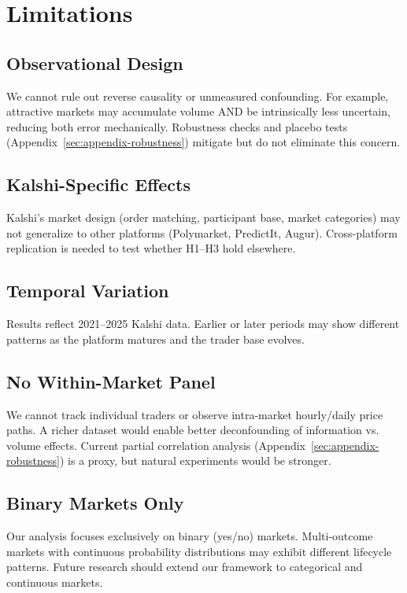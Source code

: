 \documentclass[12pt,letterpaper]{article}
\begin{document}
\clearpage
\section{Limitations}\label{sec:limitations}

\subsection{Observational Design}

We cannot rule out reverse causality or unmeasured confounding. For example, attractive markets may accumulate volume AND be intrinsically less uncertain, reducing both error mechanically. Robustness checks and placebo tests (Appendix~\ref{sec:appendix-robustness}) mitigate but do not eliminate this concern.

\subsection{Kalshi-Specific Effects}

Kalshi's market design (order matching, participant base, market categories) may not generalize to other platforms (Polymarket, PredictIt, Augur). Cross-platform replication is needed to test whether H1--H3 hold elsewhere.

\subsection{Temporal Variation}

Results reflect 2021--2025 Kalshi data. Earlier or later periods may show different patterns as the platform matures and the trader base evolves.

\subsection{No Within-Market Panel}

We cannot track individual traders or observe intra-market hourly/daily price paths. A richer dataset would enable better deconfounding of information vs. volume effects. Current partial correlation analysis (Appendix~\ref{sec:appendix-robustness}) is a proxy, but natural experiments would be stronger.

\subsection{Binary Markets Only}

Our analysis focuses exclusively on binary (yes/no) markets. Multi-outcome markets with continuous probability distributions may exhibit different lifecycle patterns. Future research should extend our framework to categorical and continuous markets.
\end{document}

